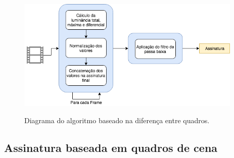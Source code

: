  \begin{figure}[h]
      \centering
      \caption{Diagrama do algoritmo baseado na diferença entre quadros.}
      \includegraphics[width=0.96\textwidth]{dados/figuras/diagramas/Diag-FrameDiff}
       	\label{fig:dia_framediff}
    \end{figure}  


    


 

%
%

\subsection{Assinatura baseada em quadros de cena}

